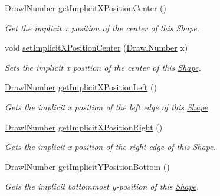 \begin{DoxyCompactItemize}
\hyperlink{classcom_1_1aarrelaakso_1_1drawl_1_1_drawl_number}{Drawl\+Number} \hyperlink{classcom_1_1aarrelaakso_1_1drawl_1_1_shape_ac7a69f5cb9dd954f5054a3bebc35af41}{get\+Implicit\+X\+Position\+Center} ()
\begin{DoxyCompactList}\small\item\em Get the implicit x position of the center of this \hyperlink{classcom_1_1aarrelaakso_1_1drawl_1_1_shape}{Shape}. \end{DoxyCompactList}\item 
void \hyperlink{classcom_1_1aarrelaakso_1_1drawl_1_1_shape_a58226399cee0d166f45e807869af0bc8}{set\+Implicit\+X\+Position\+Center} (\hyperlink{classcom_1_1aarrelaakso_1_1drawl_1_1_drawl_number}{Drawl\+Number} x)
\begin{DoxyCompactList}\small\item\em Sets the implicit x position of the center of this \hyperlink{classcom_1_1aarrelaakso_1_1drawl_1_1_shape}{Shape}. \end{DoxyCompactList}\item 
\hyperlink{classcom_1_1aarrelaakso_1_1drawl_1_1_drawl_number}{Drawl\+Number} \hyperlink{classcom_1_1aarrelaakso_1_1drawl_1_1_shape_a3cc59779e8ce4a98ff2309e0fb414527}{get\+Implicit\+X\+Position\+Left} ()
\begin{DoxyCompactList}\small\item\em Gets the implicit x position of the left edge of this \hyperlink{classcom_1_1aarrelaakso_1_1drawl_1_1_shape}{Shape}. \end{DoxyCompactList}\item 
\hyperlink{classcom_1_1aarrelaakso_1_1drawl_1_1_drawl_number}{Drawl\+Number} \hyperlink{classcom_1_1aarrelaakso_1_1drawl_1_1_shape_aedcaf32e6be1114111e5ee2ddb1214a3}{get\+Implicit\+X\+Position\+Right} ()
\begin{DoxyCompactList}\small\item\em Gets the implicit x position of the right edge of this \hyperlink{classcom_1_1aarrelaakso_1_1drawl_1_1_shape}{Shape}. \end{DoxyCompactList}\item 
\hyperlink{classcom_1_1aarrelaakso_1_1drawl_1_1_drawl_number}{Drawl\+Number} \hyperlink{classcom_1_1aarrelaakso_1_1drawl_1_1_shape_af04961079cb3993d8f73670e6695415b}{get\+Implicit\+Y\+Position\+Bottom} ()
\begin{DoxyCompactList}\small\item\em Gets the implicit bottommost y-\/position of this \hyperlink{classcom_1_1aarrelaakso_1_1drawl_1_1_shape}{Shape}. \end{DoxyCompactList}\item 

\end{DoxyCompactItemize}

